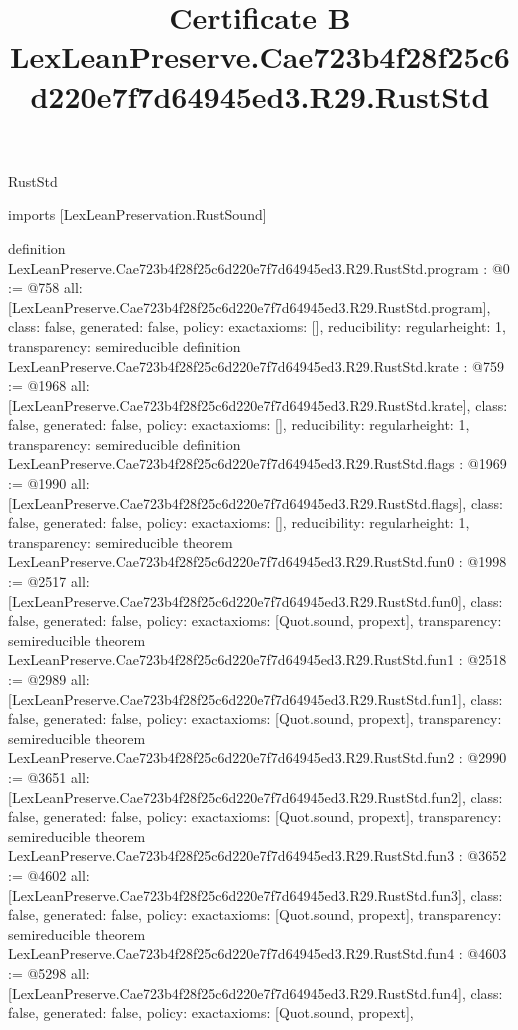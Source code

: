 \begin{lexlean}{RustStd}
\title{Certificate B LexLeanPreserve.Cae723b4f28f25c6d220e7f7d64945ed3.R29.RustStd}
\begin{coremodule}
imports [LexLeanPreservation.RustSound]

definition LexLeanPreserve.Cae723b4f28f25c6d220e7f7d64945ed3.R29.RustStd.program : @0 := @758 {
  all: [LexLeanPreserve.Cae723b4f28f25c6d220e7f7d64945ed3.R29.RustStd.program],
  class: false,
  generated: false,
  policy: exact{axioms: []},
  reducibility: regular{height: 1},
  transparency: semireducible
}
definition LexLeanPreserve.Cae723b4f28f25c6d220e7f7d64945ed3.R29.RustStd.krate : @759 := @1968 {
  all: [LexLeanPreserve.Cae723b4f28f25c6d220e7f7d64945ed3.R29.RustStd.krate],
  class: false,
  generated: false,
  policy: exact{axioms: []},
  reducibility: regular{height: 1},
  transparency: semireducible
}
definition LexLeanPreserve.Cae723b4f28f25c6d220e7f7d64945ed3.R29.RustStd.flags : @1969 := @1990 {
  all: [LexLeanPreserve.Cae723b4f28f25c6d220e7f7d64945ed3.R29.RustStd.flags],
  class: false,
  generated: false,
  policy: exact{axioms: []},
  reducibility: regular{height: 1},
  transparency: semireducible
}
theorem LexLeanPreserve.Cae723b4f28f25c6d220e7f7d64945ed3.R29.RustStd.fun0 : @1998 := @2517 {
  all: [LexLeanPreserve.Cae723b4f28f25c6d220e7f7d64945ed3.R29.RustStd.fun0],
  class: false,
  generated: false,
  policy: exact{axioms: [Quot.sound, propext]},
  transparency: semireducible
}
theorem LexLeanPreserve.Cae723b4f28f25c6d220e7f7d64945ed3.R29.RustStd.fun1 : @2518 := @2989 {
  all: [LexLeanPreserve.Cae723b4f28f25c6d220e7f7d64945ed3.R29.RustStd.fun1],
  class: false,
  generated: false,
  policy: exact{axioms: [Quot.sound, propext]},
  transparency: semireducible
}
theorem LexLeanPreserve.Cae723b4f28f25c6d220e7f7d64945ed3.R29.RustStd.fun2 : @2990 := @3651 {
  all: [LexLeanPreserve.Cae723b4f28f25c6d220e7f7d64945ed3.R29.RustStd.fun2],
  class: false,
  generated: false,
  policy: exact{axioms: [Quot.sound, propext]},
  transparency: semireducible
}
theorem LexLeanPreserve.Cae723b4f28f25c6d220e7f7d64945ed3.R29.RustStd.fun3 : @3652 := @4602 {
  all: [LexLeanPreserve.Cae723b4f28f25c6d220e7f7d64945ed3.R29.RustStd.fun3],
  class: false,
  generated: false,
  policy: exact{axioms: [Quot.sound, propext]},
  transparency: semireducible
}
theorem LexLeanPreserve.Cae723b4f28f25c6d220e7f7d64945ed3.R29.RustStd.fun4 : @4603 := @5298 {
  all: [LexLeanPreserve.Cae723b4f28f25c6d220e7f7d64945ed3.R29.RustStd.fun4],
  class: false,
  generated: false,
  policy: exact{axioms: [Quot.sound, propext]},
}
\end{coremodule}
\end{lexlean}

